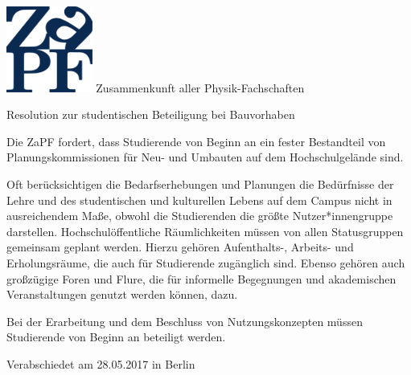 \documentclass[DIV=calc]{scrartcl}
\begin{document}
    \hspace{0.87\textwidth}
    \begin{minipage}{120pt}
        \vspace{-1.8cm}
        \includegraphics[width=80pt]{logo.pdf}
        \centering
        \small Zusammenkunft aller Physik-Fachschaften
    \end{minipage}
    \begin{center}
        \huge{Resolution zur studentischen Beteiligung bei Bauvorhaben} \\
        \normalsize
    \end{center}
    
    \vspace{1cm}    
Die ZaPF fordert, dass Studierende von Beginn an ein fester Bestandteil von Planungskommissionen für Neu- und Umbauten auf dem Hochschulgelände sind.

Oft berücksichtigen die Bedarfserhebungen und Planungen die Bedürfnisse der Lehre und des studentischen und
kulturellen Lebens auf dem Campus nicht in ausreichendem Maße, obwohl die Studierenden die größte Nutzer*innengruppe darstellen. Hochschulöffentliche Räumlichkeiten müssen von allen Statusgruppen gemeinsam geplant werden. Hierzu gehören Aufenthalts-, Arbeits- und Erholungsräume, die auch für Studierende zugänglich sind. Ebenso gehören auch großzügige Foren und Flure, die für informelle Begegnungen und akademischen Veranstaltungen genutzt werden können, dazu.

Bei der Erarbeitung und dem Beschluss von Nutzungskonzepten müssen Studierende von Beginn an beteiligt werden.    
    \vfill
    \begin{flushright}
        Verabschiedet am 28.05.2017 in Berlin
    \end{flushright}

    
\end{document}
